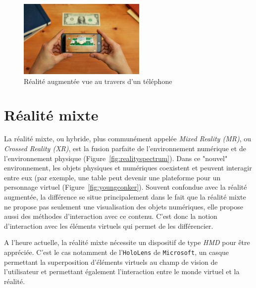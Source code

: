 \begin{figure}[H]
\centering
\includegraphics[width=0.55\textwidth]{images/AR}
\caption{Réalité augmentée vue au travers d'un téléphone\protect\footnotemark}\label{fig:AR}
\end{figure}

\section{Réalité mixte}
\label{sec:MR}
La réalité mixte\cite{ohta2014mixed}, ou hybride, plus communément appelée \emph{Mixed Reality (MR)}, ou \emph{Crossed Reality (XR)}, est la fusion parfaite de l'environnement numérique et de l'environnement physique (Figure~\ref{fig:realityspectrum}). Dans ce "nouvel" environnement, les objets physiques et numériques coexistent et peuvent interagir entre eux (par exemple, une table peut devenir une plateforme pour un personnage virtuel (Figure~\ref{fig:youngconker}). Souvent confondue avec la réalité augmentée, la différence se situe principalement dans le fait que la réalité mixte ne propose pas seulement une visualisation des objets numériques, elle propose aussi des méthodes d'interaction avec ce contenu. C'est donc la notion d'interaction avec les éléments virtuels qui permet de les différencier. 

A l'heure actuelle, la réalité mixte nécessite un dispositif de type \emph{HMD} pour être appréciée. C'est le cas notamment de l'\texttt{HoloLens} de \texttt{Microsoft}, un casque permettant la superposition d'éléments virtuels au champ de vision de l'utilisateur et permettant également l'interaction entre le monde virtuel et la réalité.

